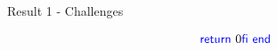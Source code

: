 \begin{frame}{Result 1 - Challenges}
\begin{minipage}[t]{0.50\linewidth}
\[{{                        \INDENT{
                        \RETURN 0}\\
                    \FI}\\
                \END}\\
            \] 
        \pause
        \begin{flushright}
            \vspace{-8.5em}
            \pause
            
        \end{flushright}
        
    \end{minipage}

\end{frame}